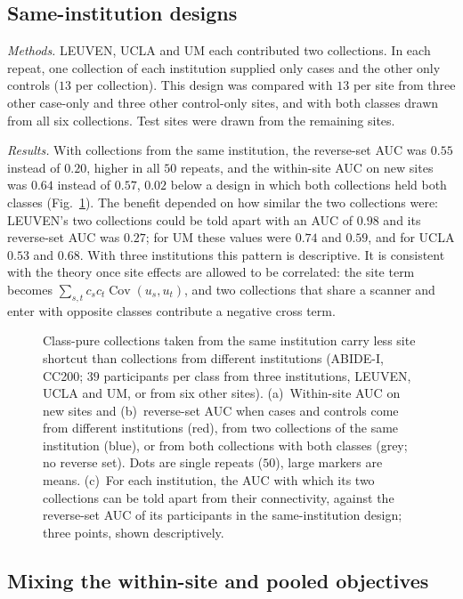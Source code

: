 \subsection{Same-institution designs}

\emph{Methods.} LEUVEN, UCLA and UM each contributed two collections. In each repeat, one collection of each institution supplied only cases and the other only controls ($13$ per collection). This design was compared with $13$ per site from three other case-only and three other control-only sites, and with both classes drawn from all six collections. Test sites were drawn from the remaining sites.

\emph{Results.} With collections from the same institution, the reverse-set AUC was $0.55$ instead of $0.20$, higher in all $50$ repeats, and the within-site AUC on new sites was $0.64$ instead of $0.57$, $0.02$ below a design in which both collections held both classes (Fig.~\ref{fig:sameinst}). The benefit depended on how similar the two collections were: LEUVEN's two collections could be told apart with an AUC of $0.98$ and its reverse-set AUC was $0.27$; for UM these values were $0.74$ and $0.59$, and for UCLA $0.53$ and $0.68$. With three institutions this pattern is descriptive. It is consistent with the theory once site effects are allowed to be correlated: the site term becomes $\sum_{s,t}c_sc_t\operatorname{Cov}(u_s,u_t)$, and two collections that share a scanner and enter with opposite classes contribute a negative cross term.

\begin{figure}[tbp]
\centering
{}
\caption{Class-pure collections taken from the same institution carry less site shortcut than collections from different institutions (ABIDE-I, CC200; $39$ participants per class from three institutions, LEUVEN, UCLA and UM, or from six other sites). (a)~Within-site AUC on new sites and (b)~reverse-set AUC when cases and controls come from different institutions (red), from two collections of the same institution (blue), or from both collections with both classes (grey; no reverse set). Dots are single repeats ($50$), large markers are means. (c)~For each institution, the AUC with which its two collections can be told apart from their connectivity, against the reverse-set AUC of its participants in the same-institution design; three points, shown descriptively.}
\label{fig:sameinst}
\end{figure}

\subsection{Mixing the within-site and pooled objectives}

